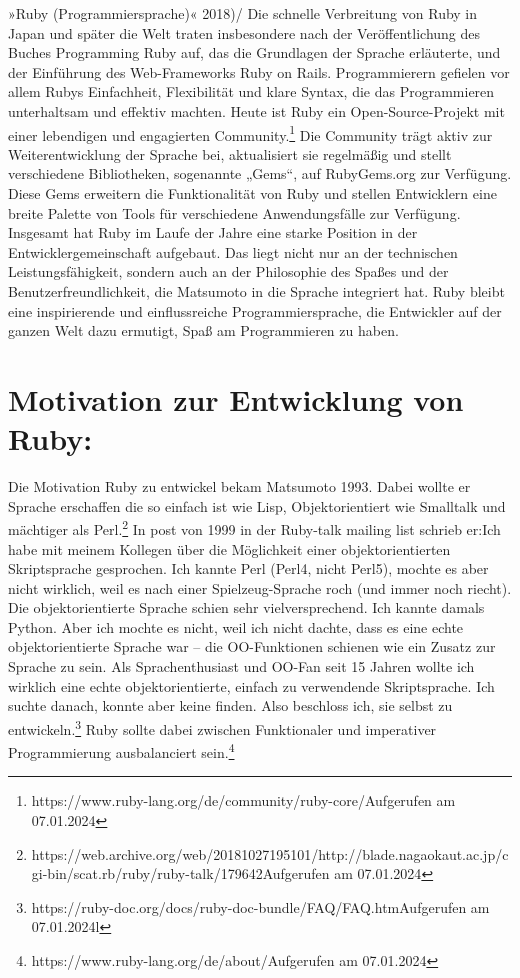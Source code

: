 \documentclass{article}
\begin{document}
{»Ruby (Programmiersprache)« 2018)/} Die schnelle Verbreitung von Ruby in Japan und später die Welt traten insbesondere nach der Veröffentlichung des Buches Programming Ruby auf, das die Grundlagen der Sprache erläuterte, und der Einführung des Web-Frameworks Ruby on Rails. Programmierern gefielen vor allem Rubys Einfachheit, Flexibilität und klare Syntax, die das Programmieren unterhaltsam und effektiv machten. Heute ist Ruby ein Open-Source-Projekt mit einer lebendigen und engagierten Community.\footnote{https://www.ruby-lang.org/de/community/ruby-core/Aufgerufen am 07.01.2024} Die Community trägt aktiv zur Weiterentwicklung der Sprache bei, aktualisiert sie regelmäßig und stellt verschiedene Bibliotheken, sogenannte „Gems“, auf RubyGems.org zur Verfügung. Diese Gems erweitern die Funktionalität von Ruby und stellen Entwicklern eine breite Palette von Tools für verschiedene Anwendungsfälle zur Verfügung. Insgesamt hat Ruby im Laufe der Jahre eine starke Position in der Entwicklergemeinschaft aufgebaut. Das liegt nicht nur an der technischen Leistungsfähigkeit, sondern auch an der Philosophie des Spaßes und der Benutzerfreundlichkeit, die Matsumoto in die Sprache integriert hat. Ruby bleibt eine inspirierende und einflussreiche Programmiersprache, die Entwickler auf der ganzen Welt dazu ermutigt, Spaß am Programmieren zu haben.
\section*{Motivation zur Entwicklung von Ruby:}
Die Motivation Ruby zu entwickel bekam Matsumoto 1993. Dabei wollte er Sprache erschaffen die so einfach ist wie Lisp, Objektorientiert wie Smalltalk und mächtiger als Perl.\footnote{https://web.archive.org/web/20181027195101/http://blade.nagaokaut.ac.jp/cgi-bin/scat.rb/ruby/ruby-talk/179642Aufgerufen am 07.01.2024}
In post von 1999 in der Ruby-talk mailing list schrieb er:Ich habe mit meinem Kollegen über die Möglichkeit einer objektorientierten Skriptsprache gesprochen. Ich kannte Perl (Perl4, nicht Perl5), mochte es aber nicht wirklich, weil es nach einer Spielzeug-Sprache roch (und immer noch riecht). Die objektorientierte Sprache schien sehr vielversprechend. Ich kannte damals Python. Aber ich mochte es nicht, weil ich nicht dachte, dass es eine echte objektorientierte Sprache war – die OO-Funktionen schienen wie ein Zusatz zur Sprache zu sein. Als Sprachenthusiast und OO-Fan seit 15 Jahren wollte ich wirklich eine echte objektorientierte, einfach zu verwendende Skriptsprache. Ich suchte danach, konnte aber keine finden. Also beschloss ich, sie selbst zu entwickeln.\footnote{https://ruby-doc.org/docs/ruby-doc-bundle/FAQ/FAQ.htmAufgerufen am 07.01.2024l}
Ruby sollte dabei zwischen Funktionaler und imperativer Programmierung ausbalanciert sein.\footnote{https://www.ruby-lang.org/de/about/Aufgerufen am 07.01.2024}
\end{document}
